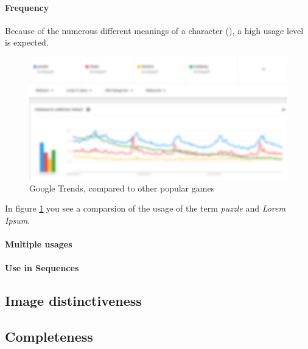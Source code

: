\documentclass{scrartcl}[10pt,a4paper]
\begin{document}
            \paragraph{Frequency}
            Because of the numerous different meanings of a \myemojiname character ({\myemoji}), a high usage level is expected.
            \begin{figure}[b]
				\includegraphics[width=1\textwidth]{google_trends.png}
				\caption{Google Trends, \textit{\myemojiname} compared to other popular games}
				\label{fig:trends}
				\end{figure}
				In figure \ref{fig:trends} you see a comparsion of the usage of the term \textit{puzzle} and \textit{Lorem Ipsum}.
            \paragraph{Multiple usages}
            \paragraph{Use in Sequences}
        \subsection{Image distinctiveness}
        \subsection{Completeness}        
\end{document}
